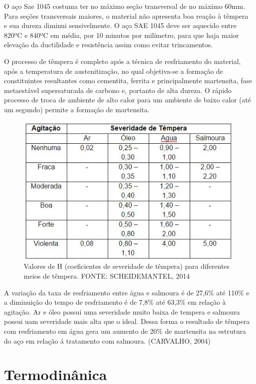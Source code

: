O aço Sae 1045 costuma ter no máximo seção transversal de no máximo 60mm. Para seções transversais maiores, o material não apresenta boa reação à têmpera e sua dureza diminui sensivelmente. O aço SAE 1045 deve ser aquecido entre 820ºC e 840ºC em média, por 10 minutos por milímetro, para que haja maior elevação da ductilidade e resistência assim como evitar trincamentos.

O processo de têmpera é completo após a técnica de resfriamento do material, após a temperatura de austenitização, no qual objetiva-se a formação de constituintes resultantes como cementita, ferrita e principalmente martensita, fase metaestável supersaturada de carbono e, portanto de alta dureza. O rápido processo de troca de ambiente de alto calor para um ambiente de baixo calor (até um segundo) permite a formação de martensita.

\begin{figure}[!h]
	\centering
	\label{tab_valoresH}
	\includegraphics[keepaspectratio=true,scale=0.8]{figuras/tab_valoresH.JPG}
	\caption{Valores de H (coeficientes de severidade de têmpera) para diferentes meios de têmpera. FONTE: SCHEIDEMANTEL, 2014}
\end{figure}

A variação da taxa de resfriamento entre água e salmoura é de 27,6\% até 110\% e a diminuição do tempo de resfriamento é de 7,8\% até 63,3\% em relação à agitação. Ar e óleo possui uma severidade muito baixa de tempera e salmoura possui uam severidade mais alta que o ideal. Dessa forma o resultado de têmpera com resfriamento em água gera um aumento de 20\% de martensita na estrutura do aço em relação á tratamento com salmoura. (CARVALHO, 2004)

\section{Termodinânica}

